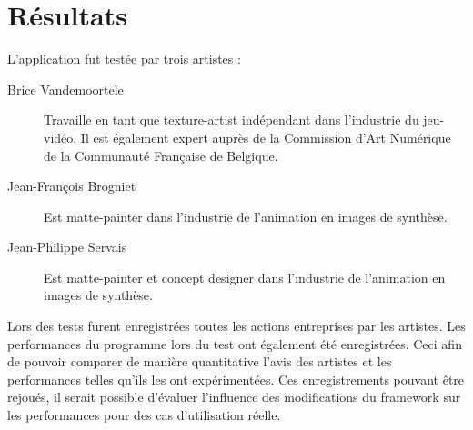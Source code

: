 	\section{Résultats}
		L'application fut testée par trois artistes :
		\begin{description}
			\item[Brice Vandemoortele] Travaille en tant que texture-artist indépendant dans l'industrie du jeu-vidéo. Il est également
			expert auprès de la Commission d'Art Numérique de la Communauté Française de Belgique. 
			\item[Jean-François Brogniet] Est matte-painter dans l'industrie de l'animation en images de synthèse.
			\item[Jean-Philippe Servais] Est matte-painter et concept designer dans l'industrie de l'animation en images de synthèse. 
		\end{description}
		
		Lors des tests furent enregistrées toutes les actions entreprises par les artistes. Les performances du programme lors du test ont également
		été enregistrées. Ceci afin de pouvoir comparer de manière quantitative l'avis des artistes et les performances telles qu'ils les
		ont expérimentées. Ces enregistrements pouvant être rejoués, il serait possible d'évaluer l'influence des modifications du framework sur
		les performances pour des cas d'utilisation réelle. 

		

